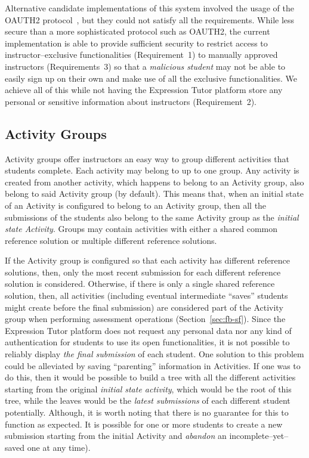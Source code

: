 \begin{chapterBody}
Alternative candidate implementations of this system involved the usage of
the OAUTH2 protocol~\cite{hardt_oauth_2012}, but they could not satisfy
all the requirements.
While less secure than a more sophisticated protocol such as OAUTH2, the
current implementation is able to provide sufficient security to restrict
access to instructor–exclusive functionalities (Requirement~1) to manually
approved instructors (Requirements~3) so that a \textit{malicious student} may
not be able to easily sign up on their own and make use of all the exclusive
functionalities. We achieve all of this while not having the Expression Tutor platform
store any personal or sensitive information about instructors (Requirement~2).

\subsection{Activity Groups}\label{sec:impl-agi-ag}

Activity groups offer instructors an easy way to group different activities
that students complete. Each activity may belong to up to one group. Any
activity is created from another activity, which happens to belong to an
Activity group, also belong to said Activity group (by default).
This means that, when an initial state of an Activity is configured to
belong to an Activity group, then all the submissions of the students
also belong to the same Activity group as the \textit{initial state Activity}.
Groups may contain activities with either a shared common reference solution
or multiple different reference solutions.

If the Activity group is configured so that each activity has different
reference  solutions, then, only the most recent submission for each different
reference solution is considered.
Otherwise, if there is only a single shared reference solution, then, all
activities (including eventual intermediate ``saves'' students might
create before the final submission) are considered part of the Activity
group when performing assessment operations (Section~\ref{sec:fb-sf}).
Since the Expression Tutor platform does not request any personal data nor any
kind of authentication for students to use its open functionalities, it is
not possible to reliably display \textit{the final submission} of each
student. One solution to this problem could be alleviated by saving
``parenting'' information in Activities. If one was to do this, then it would
be possible to build a tree with all the different activities starting from the
original \textit{initial state activity}, which  would be the root of this
tree, while the leaves would be the \textit{latest submissions} of each
different student potentially. Although, it is worth noting that there is no
guarantee for this to function as expected. It is possible for one or more
students to create a new submission starting from the initial Activity and
\textit{abandon} an incomplete–yet–saved one at any time).


\end{chapterBody}
